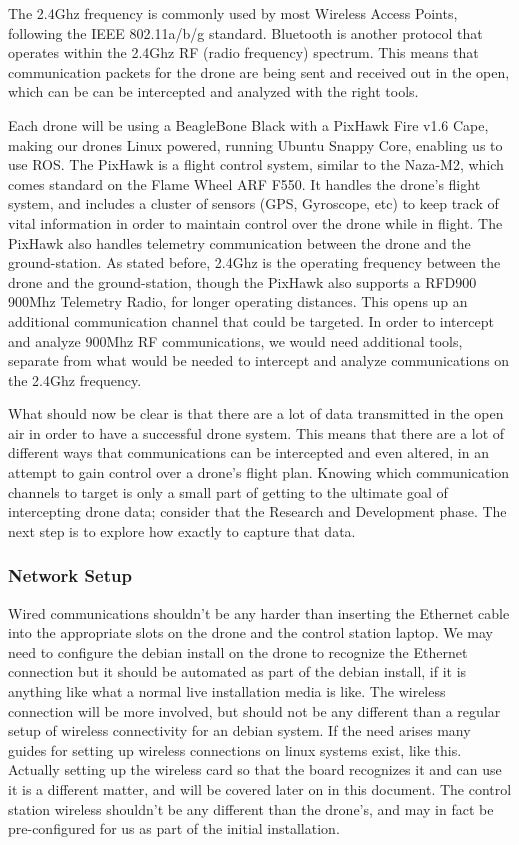 \documentclass[IEEEtran,letterpaper,10pt,notitlepage,draftclsnofoot,onecolumn]{article}
\begin{document}
The 2.4Ghz frequency is commonly used by most Wireless Access Points, following the IEEE 802.11a/b/g
standard. Bluetooth is another protocol that operates within the 2.4Ghz RF (radio frequency)
spectrum\cite{HakDaSpectrum}. This means that communication packets for the drone are being sent and received out in the
open, which can be can be intercepted and analyzed with the right tools.

Each drone will be using a BeagleBone Black with a PixHawk Fire v1.6 Cape, making our drones Linux powered, running
Ubuntu Snappy Core, enabling us to use ROS\cite{PixHawk}. The PixHawk is a flight control system, similar to the
Naza-M2, which comes standard on the Flame Wheel ARF F550. It handles the drone's flight system, and includes a cluster
of sensors (GPS, Gyroscope, etc) to keep track of vital information in order to maintain control over the drone while
in flight. The PixHawk also handles telemetry communication between the drone and the ground-station. As stated before,
2.4Ghz is the operating frequency between the drone and the ground-station, though the PixHawk also supports a RFD900
900Mhz Telemetry Radio, for longer operating distances\cite{PixHawkDocs}. This opens up an additional communication
channel that could be targeted. In order to intercept and analyze 900Mhz RF communications, we would need additional
tools, separate from what would be needed to intercept and analyze communications on the 2.4Ghz
frequency\cite{HakDaSpectrum900}.

What should now be clear is that there are a lot of data transmitted in the open air in order to have a successful
drone system. This means that there are a lot of different ways that communications can be intercepted and even
altered, in an attempt to gain control over a drone's flight plan. Knowing which communication channels to target
is only a small part of getting to the ultimate goal of intercepting drone data; consider that the Research and
Development phase. The next step is to explore how exactly to capture that data.

\subsubsection{Network Setup}
Wired communications shouldn't be any harder than inserting the Ethernet cable into the appropriate slots on the drone and the control station laptop. 
We may need to configure the debian install on the drone to recognize the Ethernet connection but it should be automated as part of the debian install, if it is anything like what a normal live installation media is like.
The wireless connection will be more involved, but should not be any different than a regular setup of wireless connectivity for an debian system. 
If the need arises many guides for setting up wireless connections on linux systems exist, like this. \cite{wirelessconfig} 
Actually setting up the wireless card so that the board recognizes it and can use it is a different matter, and will be covered later on in this document. 
The control station wireless shouldn't be any different than the drone's, and may in fact be pre-configured for us as part of the initial installation.
\end{document}
